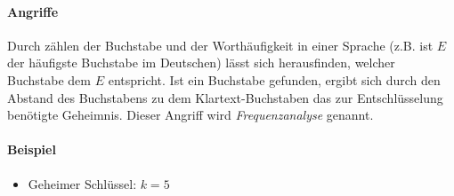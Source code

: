			\paragraph{Angriffe}
				Durch zählen der Buchstabe und der Worthäufigkeit in einer Sprache (z.B. ist \(E\) der häufigste Buchstabe im Deutschen) lässt sich herausfinden, welcher Buchstabe dem \(E\) entspricht. Ist ein Buchstabe gefunden, ergibt sich durch den Abstand des Buchstabens zu dem Klartext-Buchstaben das zur Entschlüsselung benötigte Geheimnis. Dieser Angriff wird \textit{Frequenzanalyse} genannt.

			\paragraph{Beispiel}
				\begin{itemize}
					\item Geheimer Schlüssel: \tabto{5cm} \( k = 5 \)
				\end{itemize}

